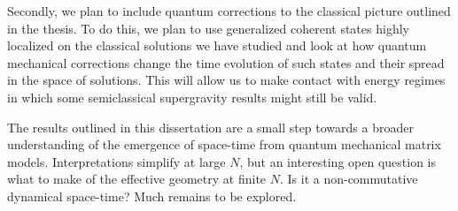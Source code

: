 Secondly, we plan to include quantum corrections to the classical picture outlined in the thesis. To do this, we plan to use generalized coherent states highly localized on the classical solutions we have studied and look at how quantum mechanical corrections change the time evolution of such states and their spread in the space of solutions. This will allow us to make contact with energy regimes in which some semiclassical supergravity results might still be valid.

The results outlined in this dissertation are a small step towards a broader understanding of the emergence of space-time from quantum mechanical matrix models. Interpretations simplify at large $N$, but an interesting open question is what to make of the effective geometry at finite $N$. Is it a non-commutative dynamical space-time? Much remains to be explored.